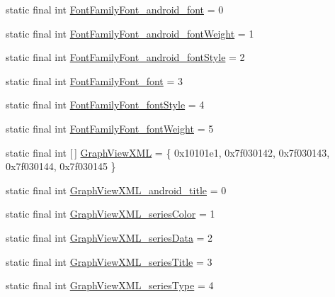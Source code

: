 \begin{DoxyCompactItemize}
static final int \mbox{\hyperlink{classcom_1_1jjoe64_1_1graphview_1_1_r_1_1styleable_aa0d94cc71a516c780614483f239278c2}{Font\+Family\+Font\+\_\+android\+\_\+font}} = 0
\item 
static final int \mbox{\hyperlink{classcom_1_1jjoe64_1_1graphview_1_1_r_1_1styleable_ac38d1912d5d66c88ff908655ddeefdf1}{Font\+Family\+Font\+\_\+android\+\_\+font\+Weight}} = 1
\item 
static final int \mbox{\hyperlink{classcom_1_1jjoe64_1_1graphview_1_1_r_1_1styleable_aaca2131623626d063d0e9cbeb7ebc518}{Font\+Family\+Font\+\_\+android\+\_\+font\+Style}} = 2
\item 
static final int \mbox{\hyperlink{classcom_1_1jjoe64_1_1graphview_1_1_r_1_1styleable_a3648e62c9041f0b6ef89bb5e6341b8c5}{Font\+Family\+Font\+\_\+font}} = 3
\item 
static final int \mbox{\hyperlink{classcom_1_1jjoe64_1_1graphview_1_1_r_1_1styleable_a00271192447e5e2251f88e9a8961212b}{Font\+Family\+Font\+\_\+font\+Style}} = 4
\item 
static final int \mbox{\hyperlink{classcom_1_1jjoe64_1_1graphview_1_1_r_1_1styleable_a046b0dc66071780dad36df42c02f8aac}{Font\+Family\+Font\+\_\+font\+Weight}} = 5
\item 
static final int \mbox{[}$\,$\mbox{]} \mbox{\hyperlink{classcom_1_1jjoe64_1_1graphview_1_1_r_1_1styleable_a27ea4b5c990e4e63c803051cca4fbf4e}{Graph\+View\+X\+ML}} = \{ 0x10101e1, 0x7f030142, 0x7f030143, 0x7f030144, 0x7f030145 \}
\item 
static final int \mbox{\hyperlink{classcom_1_1jjoe64_1_1graphview_1_1_r_1_1styleable_a97498e6cd232c826e266ca5d2fea2bd1}{Graph\+View\+X\+M\+L\+\_\+android\+\_\+title}} = 0
\item 
static final int \mbox{\hyperlink{classcom_1_1jjoe64_1_1graphview_1_1_r_1_1styleable_ab2104be2b40ad583c088b39c0c317a1c}{Graph\+View\+X\+M\+L\+\_\+series\+Color}} = 1
\item 
static final int \mbox{\hyperlink{classcom_1_1jjoe64_1_1graphview_1_1_r_1_1styleable_a248eac49f78ec63973ad5221987ac52d}{Graph\+View\+X\+M\+L\+\_\+series\+Data}} = 2
\item 
static final int \mbox{\hyperlink{classcom_1_1jjoe64_1_1graphview_1_1_r_1_1styleable_abce843286d09fed65aada985667b153a}{Graph\+View\+X\+M\+L\+\_\+series\+Title}} = 3
\item 
static final int \mbox{\hyperlink{classcom_1_1jjoe64_1_1graphview_1_1_r_1_1styleable_aa0e2345e3246a69f586bc8251a199d0a}{Graph\+View\+X\+M\+L\+\_\+series\+Type}} = 4
\end{DoxyCompactItemize}
